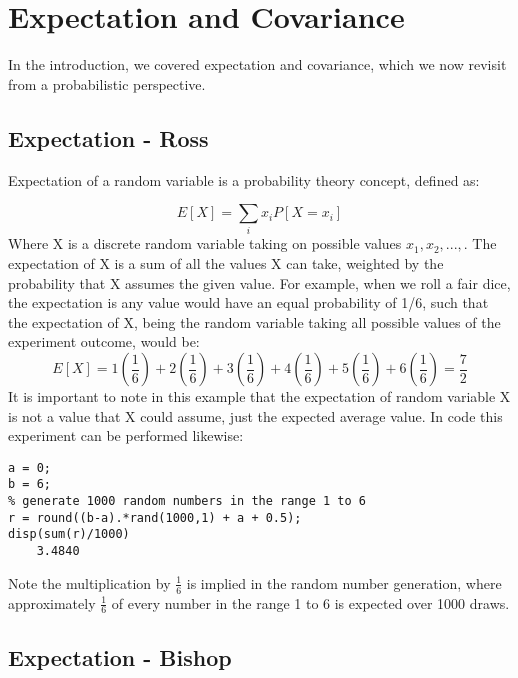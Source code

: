 \section{Expectation and Covariance}

In the introduction, we covered expectation and covariance, which we now revisit from a probabilistic perspective. 

\subsection{Expectation - Ross}

Expectation of a random variable is a probability theory concept, defined as:

\begin{equation}
E[X] = \sum_i x_i P[X=x_i] \label{Expectation}
\end{equation}
Where X is a discrete random variable taking on possible values $x_1,x_2,...,$. The expectation of X is a sum of all the values X can take, weighted by the probability that X assumes the given value. For example, when we roll a fair dice, the expectation is any value would have an equal probability of 1/6, such that the expectation of X, being the random variable taking all possible values of the experiment outcome, would be:
$$
    E[X]=1(\frac{1}{6}) + 2(\frac{1}{6}) + 3(\frac{1}{6}) + 4(\frac{1}{6}) + 5(\frac{1}{6}) + 6(\frac{1}{6})=\frac{7}{2}
$$
It is important to note in this example that the expectation of random variable X is not a value that X could assume, just the expected average value. In code this experiment can be performed likewise:
\begin{verbatim}
a = 0;
b = 6;
% generate 1000 random numbers in the range 1 to 6
r = round((b-a).*rand(1000,1) + a + 0.5);
disp(sum(r)/1000)
    3.4840
\end{verbatim}
Note the multiplication by $\frac{1}{6}$ is implied in the random number generation, where approximately $\frac{1}{6}$ of every number in the range 1 to 6 is expected over 1000 draws.

\subsection{Expectation - Bishop}

